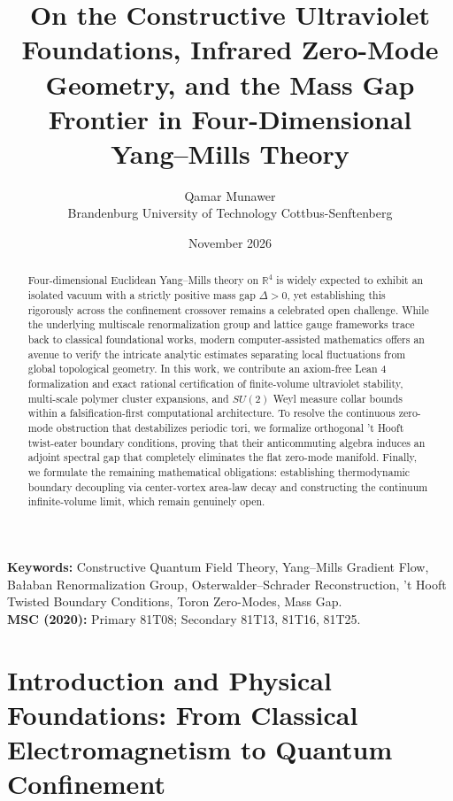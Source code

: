 \documentclass[11pt,a4paper]{article}
\title{\textbf{On the Constructive Ultraviolet Foundations, Infrared Zero-Mode Geometry, and the Mass Gap Frontier in Four-Dimensional Yang--Mills Theory}}
\author{Qamar Munawer \\ Brandenburg University of Technology Cottbus-Senftenberg}
\date{November 2026}
\theoremstyle{definition}
\theoremstyle{remark}
\begin{document}
\maketitle

\begin{abstract}
Four-dimensional Euclidean Yang--Mills theory on $\mathbb{R}^4$ is widely expected to exhibit an isolated vacuum with a strictly positive mass gap $\Delta > 0$, yet establishing this rigorously across the confinement crossover remains a celebrated open challenge. While the underlying multiscale renormalization group and lattice gauge frameworks trace back to classical foundational works, modern computer-assisted mathematics offers an avenue to verify the intricate analytic estimates separating local fluctuations from global topological geometry. In this work, we contribute an axiom-free Lean 4 formalization and exact rational certification of finite-volume ultraviolet stability, multi-scale polymer cluster expansions, and $SU(2)$ Weyl measure collar bounds within a falsification-first computational architecture. To resolve the continuous zero-mode obstruction that destabilizes periodic tori, we formalize orthogonal 't Hooft twist-eater boundary conditions, proving that their anticommuting algebra induces an adjoint spectral gap that completely eliminates the flat zero-mode manifold. Finally, we formulate the remaining mathematical obligations: establishing thermodynamic boundary decoupling via center-vortex area-law decay and constructing the continuum infinite-volume limit, which remain genuinely open.
\end{abstract}

\noindent\textbf{Keywords:} Constructive Quantum Field Theory, Yang--Mills Gradient Flow, Ba{\l}aban Renormalization Group, Osterwalder--Schrader Reconstruction, 't Hooft Twisted Boundary Conditions, Toron Zero-Modes, Mass Gap. \\
\textbf{MSC (2020):} Primary 81T08; Secondary 81T13, 81T16, 81T25.

\newpage
\tableofcontents
\newpage

\section{Introduction and Physical Foundations: From Classical Electromagnetism to Quantum Confinement}
\end{document}
